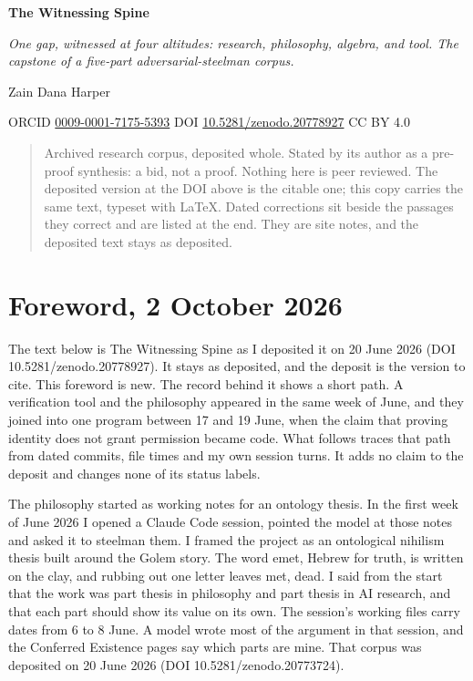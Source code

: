 \documentclass[11pt]{article}
\begin{document}
\begin{center}
{\LARGE\bfseries The Witnessing Spine\par}
\medskip
{\large\emph{One gap, witnessed at four altitudes: research, philosophy, algebra, and tool. The capstone of a five-part adversarial-steelman corpus.}\par}
\medskip
Zain Dana Harper\par
{\small ORCID \href{https://orcid.org/0009-0001-7175-5393}{0009-0001-7175-5393} \textperiodcentered{} DOI \href{https://doi.org/10.5281/zenodo.20778927}{10.5281/zenodo.20778927} \textperiodcentered{} CC BY 4.0\par}
\end{center}

\begin{quote}\small
Archived research corpus, deposited whole. Stated by its author as a pre-proof synthesis: a bid, not a proof. Nothing here is peer reviewed. The deposited version at the DOI above is the citable one; this copy carries the same text, typeset with LaTeX. Dated corrections sit beside the passages they correct and are listed at the end. They are site notes, and the deposited text stays as deposited.
\end{quote}

\section*{Foreword, 2 October 2026}

The text below is The Witnessing Spine as I deposited it on 20 June 2026 (DOI 10.5281/\allowbreak{}zenodo.20778927). It stays as deposited, and the deposit is the version to cite. This foreword is new. The record behind it shows a short path. A verification tool and the philosophy appeared in the same week of June, and they joined into one program between 17 and 19 June, when the claim that proving identity does not grant permission became code. What follows traces that path from dated commits, file times and my own session turns. It adds no claim to the deposit and changes none of its status labels.

The philosophy started as working notes for an ontology thesis. In the first week of June 2026 I opened a Claude Code session, pointed the model at those notes and asked it to steelman them. I framed the project as an ontological nihilism thesis built around the Golem story. The word emet, Hebrew for truth, is written on the clay, and rubbing out one letter leaves met, dead. I said from the start that the work was part thesis in philosophy and part thesis in AI research, and that each part should show its value on its own. The session's working files carry dates from 6 to 8 June. A model wrote most of the argument in that session, and the Conferred Existence pages say which parts are mine. That corpus was deposited on 20 June 2026 (DOI 10.5281/\allowbreak{}zenodo.20773724).
\end{document}
